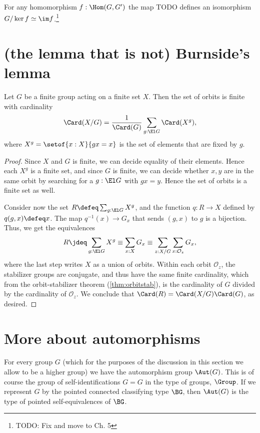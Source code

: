\begin{theorem}
  \label{thm:fund-thm-homs}
  For any homomorphism $f : \Hom(G,G')$
  the map {\color{blue} TODO} defines an isomorphism
  $G/\ker f \simeq \im f$.\footnote{TODO: Fix and move to Ch. 5}
\end{theorem}

\section{(the lemma that is not) Burnside's lemma}
\label{sec:burnsides-lemma}
\label{lem:burnsides-lemma}

\begin{lemma}
  \label{lem:burnside}
  Let $G$ be a finite group acting on a finite set $X$.
  Then the set of orbits is finite with cardinality
  \[
    \Card(X/G) = \frac1{\Card(G)}\sum_{g:\El G}\Card(X^g),
  \]
  where $X^g = \setof{x:X}{gx=x}$ is the set of elements
  that are fixed by $g$.
\end{lemma}
\begin{proof}
  Since $X$ and $G$ is finite, we can decide equality of their elements.
  Hence each $X^g$ is a finite set, and since $G$ is finite,
  we can decide whether $x,y$ are in the same orbit by searching
  for a $g : \El G$ with $gx = y$.
  Hence the set of orbits is a finite set as well.

  Consider now the set $R \defeq \sum_{g:\El G} X^g$,
  and the function $q : R \to X$
  defined by $q(g,x) \defeq x$.
  The map $q^{-1}(x) \to G_x$ that sends $(g,x)$ to $g$ is a bijection.
  Thus, we get the equivalences
  \[
    R \jdeq \sum_{g:\El G} X^g \equiv \sum_{x:X} G_x
    \equiv \sum_{z:X/G} \sum_{x : \mathcal O_z} G_x,
  \]
  where the last step writes $X$ as a union of orbits.
  Within each orbit $\mathcal O_z$,
  the stabilizer groups are conjugate,
  and thus have the same finite cardinality,
  which from the orbit-stabilizer theorem (\cref{thm:orbitstab}),
  is the cardinality of $G$ divided by the cardinality of $\mathcal O_z$.
  We conclude that $\Card(R) = \Card(X/G)\Card(G)$, as desired.
\end{proof}

\section{More about automorphisms}
\label{sec:automorphisms}

For every group $G$ (which for the purposes of the discussion
in this section we allow to be a higher group)
we have the automorphism group $\Aut(G)$.
This is of course the group of self-identifications $G = G$ in the type of groups, $\Group$.
If we represent $G$ by the pointed connected classifying type $\BG$,
then $\Aut(G)$ is the type of pointed self-equivalences of $\BG$.

